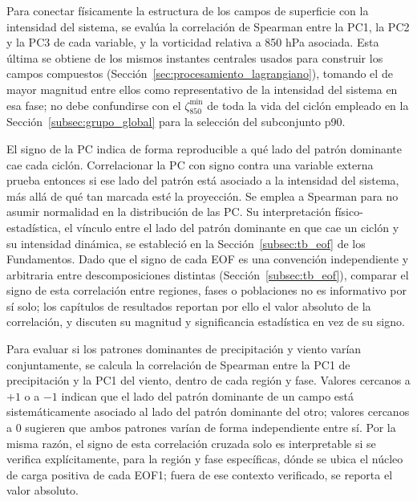 Para conectar físicamente la estructura de los campos de superficie con la intensidad del sistema, se evalúa la correlación de Spearman entre la PC1, la PC2 y la PC3 de cada variable, y la vorticidad relativa a 850 hPa asociada. 
Esta última se obtiene de los mismos instantes centrales usados para construir los campos compuestos (Sección~\ref{sec:procesamiento_lagrangiano}), tomando el de mayor magnitud entre ellos como representativo de la intensidad del sistema en esa fase; no debe confundirse con el $\zeta_{850}^{\min}$ de toda la vida del ciclón empleado en la Sección~\ref{subsec:grupo_global} para la selección del subconjunto p90.

El signo de la PC indica de forma reproducible a qué lado del patrón dominante cae cada ciclón. 
Correlacionar la PC con signo contra una variable externa prueba entonces si ese lado del patrón está asociado a la intensidad del sistema, más allá de qué tan marcada esté la proyección. 
Se emplea a Spearman para no asumir normalidad en la distribución de las PC. 
Su interpretación físico-estadística, el vínculo entre el lado del patrón dominante en que cae un ciclón y su intensidad dinámica, se estableció en la Sección~\ref{subsec:tb_eof} de los Fundamentos.
Dado que el signo de cada EOF es una convención independiente y arbitraria entre descomposiciones distintas (Sección~\ref{subsec:tb_eof}), comparar el signo de esta correlación entre regiones, fases o poblaciones no es informativo por sí solo; los capítulos de resultados reportan por ello el valor absoluto de la correlación, y discuten su magnitud y significancia estadística en vez de su signo.

Para evaluar si los patrones dominantes de precipitación y viento varían conjuntamente, se calcula la correlación de Spearman entre la PC1 de precipitación y la PC1 del viento, dentro de cada región y fase.
Valores cercanos a $+1$ o a $-1$ indican que el lado del patrón dominante de un campo está sistemáticamente asociado al lado del patrón dominante del otro; valores cercanos a $0$ sugieren que ambos patrones varían de forma independiente entre sí.
Por la misma razón, el signo de esta correlación cruzada solo es interpretable si se verifica explícitamente, para la región y fase específicas, dónde se ubica el núcleo de carga positiva de cada EOF1; fuera de ese contexto verificado, se reporta el valor absoluto.


